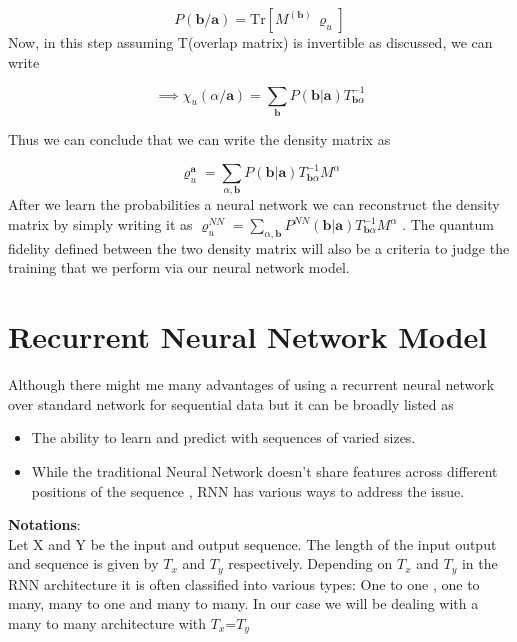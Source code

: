 \documentclass[a4paper]{article}
\begin{document}
\begin{equation}
     P(\boldsymbol{b/a})=\text{Tr}\left[ M^{(\boldsymbol{b})}\, \varrho_{u}\right]
 \end{equation} 
Now, in this step assuming T(overlap matrix) is invertible as discussed, we can write 

\begin{equation}
    \implies \chi_{u}(\alpha / \textbf{a}) = \sum_{\textbf{b}}P(\boldsymbol{b|a})T^{-1}_{\textbf{b}\alpha}
 \end{equation} 
 
 Thus we can conclude that we can write the density matrix as 
 
\begin{equation}
     \varrho^{\textbf{a}}_u=\sum_{\alpha,\textbf{b}}P(\boldsymbol{b|a})T^{-1}_{\textbf{b}\alpha}M^{\alpha}
 \end{equation} 
 After we learn the probabilities a neural network we can reconstruct the density matrix by simply writing it as $
     \varrho^{NN}_u=\sum_{\alpha,\textbf{b}}P^{NN}(\boldsymbol{b|a})T^{-1}_{\textbf{b}\alpha}M^{\alpha} $ . The quantum fidelity defined between the two density matrix will also be a criteria to judge the training that we perform via our neural network model.
 
\section*{Recurrent Neural Network Model}
Although there might me many advantages of using a recurrent neural network over standard network for sequential data but it can be broadly listed as \\
\begin{itemize}
    \item  The ability to learn and predict with sequences of varied sizes.
 
    \item While the traditional Neural Network doesn't share features across different positions of the sequence , RNN has various ways to address the issue. 
 
\end{itemize}
\textbf{Notations}: \\ Let X and Y be the input and output sequence. The length of the input output and sequence is given by $T_{x}$ and $T_{y}$ respectively. Depending on $T_{x}$ and $T_{y}$ in the RNN architecture it is often classified into various types: One to one , one to many, many to one and many to many. In our case we will be dealing with a many to many architecture with $T_{x}$=$T_{y}$
\end{document}
